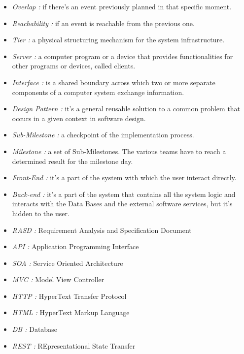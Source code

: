 \newpage
{}
\begin{itemize}
	\item \emph{Overlap :} if there’s an event previously planned in that specific moment.
	\item \emph{Reachability :} if an event is reachable from the previous one.
	\item \emph{Tier :} a physical structuring mechanism for the system infrastructure.
	\item \emph{Server :} a computer program or a device that provides functionalities for other programs or devices, called clients.
	\item \emph{Interface :} is a shared boundary across which two or more separate components of a computer system exchange information.
	\item \emph{Design Pattern :} it's a general reusable solution to a common problem that occurs in a given context in software design.
	\item \emph{Sub-Milestone :} a checkpoint of the implementation process.
	\item \emph{Milestone :} a set of Sub-Milestones. The various teams have to reach a determined result for the milestone day.
	\item \emph{Front-End :} it's a part of the system with which the user interact directly.
	\item \emph{Back-end :} it's a part of the system that contains all the system logic and interacts with the Data Bases and the external software services, but it's hidden to the user.
\end{itemize}

\begin{itemize}
	\setlength{\leftskip}{0.5cm}
	\item \emph{RASD :} Requirement Analysis and Specification Document
	\item \emph{API :} Application Programming Interface
	\item \emph{SOA :} Service Oriented Architecture
	\item \emph{MVC :} Model View Controller
	\item \emph{HTTP :} HyperText Transfer Protocol
	\item \emph{HTML :} HyperText Markup Language
	\item \emph{DB :} Database
	\item \emph{REST :} REpresentational State Transfer
\end{itemize}

